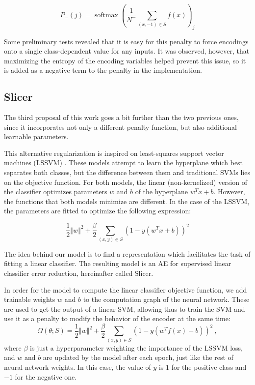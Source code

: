 \begin{equation} P_-(j)=\operatorname{softmax}\left(\frac{1}{N^{-}}\sum_{(x,-1)\in S}f(x)\right)_j \end{equation}

Some preliminary tests revealed that it is easy for this penalty to force encodings onto a single class-dependent value for any inputs. It was observed, however, that maximizing the entropy of the encoding variables helped prevent this issue, so it is added as a negative term to the penalty in the implementation.

\subsection{Slicer}

The third proposal of this work goes a bit further than the two previous ones, since it incorporates not only a different penalty function, but also additional learnable parameters.

This alternative regularization is inspired on least-squares support vector machines (LSSVM) . These models attempt to learn the hyperplane which best separates both classes, but the difference between them and traditional SVMs lies on the objective function. For both models, the linear (non-kernelized) version of the classifier optimizes parameters $w$ and $b$ of the hyperplane $w^Tx+b$. However, the functions that both models minimize are different. In the case of the LSSVM, the parameters are fitted to optimize the following expression:

\begin{equation}\frac 1 2 \left\Vert w\right\Vert^2+\frac \beta 2\sum_{(x,y)\in S}\left(1 - y\left(w^Tx+b\right)\right)^2\end{equation}

The idea behind our model is to find a representation which facilitates the task of fitting a linear classifier. The resulting model is an AE for supervised linear classifier error reduction, hereinafter called Slicer.

In order for the model to compute the linear classifier objective function, we add trainable weights $w$ and $b$ to the computation graph of the neural network. These are used to get the output of a linear SVM, allowing thus to train the SVM and use it as a penalty to modify the behavior of the encoder at the same time:
\begin{equation}\Omega(\theta;S)=\frac 1 2 \left\Vert w\right\Vert^2+\frac \beta 2\sum_{(x,y)\in S}\left(1 - y\left(w^Tf(x)+b\right)\right)^2~,\end{equation}
where $\beta$ is just a hyperparameter weighting the importance of the LSSVM loss, and $w$ and $b$ are updated by the model after each epoch, just like the rest of neural network weights. In this case, the value of $y$ is $1$ for the positive class and $-1$ for the negative one.

